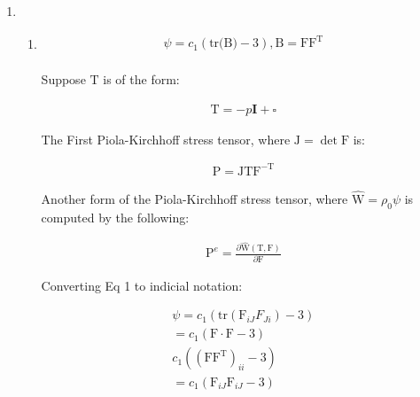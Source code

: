 \begin{problem}
    \noindent
    \normalfont

    \begin{enumerate}
        \item 
        \begin{enumerate}
            \item \begin{align}
                \psi=c_{1}(\text{tr(B)}-3), \text{B}=\text{FF}^{\text{T}} \\
                \end{align}
                
                
                Suppose $\text{T}$ is of the form:
                
                
                \begin{align}
                \text{T} = -p\mathbf{\text{I}}+ \square
                \end{align}
                
                
                The First Piola-Kirchhoff stress tensor, where $\text{J}=\det \text{F}$ is:
                
                
                \begin{align}
                \text{P}=\text{J}\text{T}\text{F}^{-\text{T}}
                \end{align}
                
                
                Another form of the Piola-Kirchhoff stress tensor, where $\hat{\text{W}} = \rho_{0}\psi$ is computed by the following:
                
                
                \begin{align}
                \text{P}^{e}=\frac{ \partial \hat{\text{W}} (\text{T},\text{F})}{ \partial \text{F} } 
                \end{align}
                
                Converting Eq 1 to indicial notation:
                
                \begin{align}
                \psi=c_{1}(\text{tr}(\text{F}_{iJ}F_{Ji})-3) \\
                =c_{1}(\text{F}\cdot \text{F}-3) \\
                c_{1}((\text{FF}^{\text{T}})_{ii}-3) \\
                =c_{1}(\text{F}_{iJ}\text{F}_{iJ}-3) \\
                \end{align}
                

\end{enumerate}
\end{enumerate}
\end{problem}
